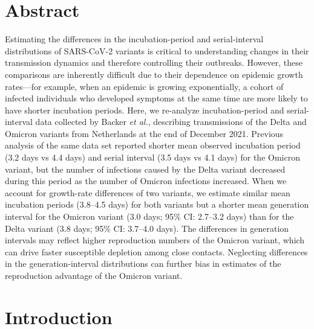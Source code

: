 \documentclass[12pt]{article}
\date{\today}
\begin{document}
\begin{flushleft}{
	\Large
	\textbf{}
}
\bigskip

\section*{Abstract}

Estimating the differences in the incubation-period and serial-interval distributions of SARS-CoV-2 variants is critical to understanding changes in their transmission dynamics and therefore controlling their outbreaks.
However, these comparisons are inherently difficult due to their dependence on epidemic growth rates---for example, when an epidemic is growing exponentially, a cohort of infected individuals who developed symptoms at the same time are more likely to have shorter incubation periods.
Here, we re-analyze incubation-period and serial-interval data collected by Backer \textit{et al.}, describing transmissions of the Delta and Omicron variants from Netherlands at the end of December 2021.
Previous analysis of the same data set reported shorter mean observed incubation period (3.2 days vs 4.4 days) and serial interval (3.5 days vs 4.1 days) for the Omicron variant, but the number of infections caused by the Delta variant decreased during this period as the number of Omicron infections increased.
When we account for growth-rate differences of two variants, we estimate similar mean incubation periods (3.8--4.5 days) for both variants but a shorter mean generation interval for the Omicron variant (3.0 days; 95\% CI: 2.7--3.2 days) than for the Delta variant (3.8 days; 95\% CI: 3.7--4.0 days).
The differences in generation intervals may reflect higher reproduction numbers of the Omicron variant, which can drive faster susceptible depletion among close contacts.
Neglecting differences in the generation-interval distributions can further bias in estimates of the reproduction advantage of the Omicron variant.

\end{flushleft}

\pagebreak

\section{Introduction}
\end{document}
